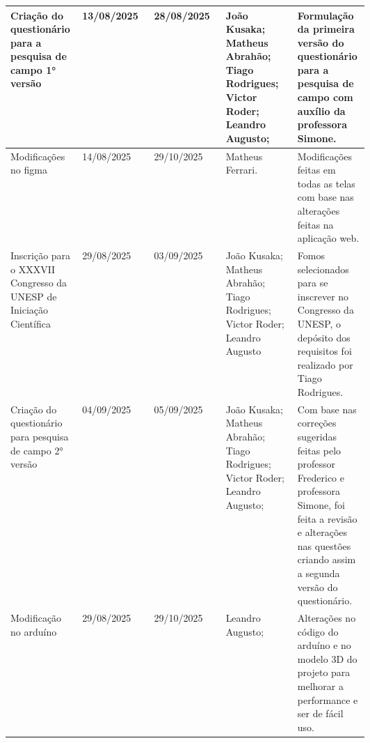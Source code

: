 \documentclass[
landscape,
  a4paper,
  12pt,
  english,
  brazilian,
]{article}
\begin{document}
 \begin{table}[]
\centering


\begin{tabular}{|>{\raggedright\arraybackslash}p{0.2\linewidth}|l|l|>{\raggedright\arraybackslash}p{0.2\linewidth}|>{\raggedright\arraybackslash}p{0.2\linewidth}|}

\hline
 Criação do questionário para a pesquisa de campo 1° versão&                            13/08/2025&                28/08/2025&                 João Kusaka; Matheus Abrahão; Tiago Rodrigues; Victor Roder; Leandro Augusto;&                                 Formulação da primeira versão do questionário para a pesquisa de campo com auxílio da professora Simone.\\ \hline
                  Modificações no figma&                            14/08/2025&               29/10/2025&                 Matheus Ferrari.&                                  Modificações feitas em todas as telas com base nas alterações feitas na aplicação web.\\ \hline
                  Inscrição para o XXXVII Congresso da UNESP de Iniciação Científica& 29/08/2025& 03/09/2025& João Kusaka; Matheus Abrahão; Tiago Rodrigues; Victor Roder; Leandro Augusto &Fomos selecionados para se inscrever no Congresso da UNESP, o depósito dos requisitos foi realizado por Tiago Rodrigues.\\\hline
                  Criação do questionário para pesquisa de campo 2° versão&                            04/09/2025&                05/09/2025&                 João Kusaka; Matheus Abrahão; Tiago Rodrigues; Victor Roder; Leandro Augusto;&                                  Com base nas correções sugeridas feitas pelo professor Frederico e professora Simone, foi feita a revisão e alterações nas questões criando assim a segunda versão do questionário.\\ \hline
                  Modificação no arduíno&                            29/08/2025&                29/10/2025&                  Leandro Augusto;&                                 Alterações no código do arduíno e no modelo 3D do projeto para melhorar a performance e ser de fácil uso.\\ \hline
 
\end{tabular}


\end{table}
\end{document}
